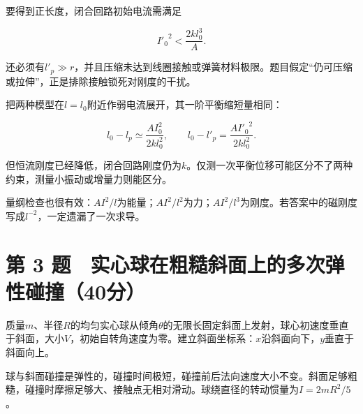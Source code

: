 \documentclass[12pt,a4paper,fontset=fandol]{ctexart}
\begin{document}
要得到正长度，闭合回路初始电流需满足

\[
{I'_0}^2<\frac{2kl_0^3}{A}.
\]

还必须有\(l'_p\gg r\)，并且压缩未达到线圈接触或弹簧材料极限。题目假定``仍可压缩或拉伸''，正是排除接触锁死对刚度的干扰。

把两种模型在\(l=l_0\)附近作弱电流展开，其一阶平衡缩短量相同：

\[
l_0-l_p\simeq\frac{AI_0^2}{2kl_0^2},
\qquad
l_0-l'_p=\frac{A{I'_0}^2}{2kl_0^2}.
\]

但恒流刚度已经降低，闭合回路刚度仍为\(k\)。仅测一次平衡位移可能区分不了两种约束，测量小振动或增量力则能区分。

量纲检查也很有效：\(AI^2/l\)为能量；\(AI^2/l^2\)为力；\(AI^2/l^3\)为刚度。若答案中的磁刚度写成\(l^{-2}\)，一定遗漏了一次求导。

\clearpage

\section{第 3
题　实心球在粗糙斜面上的多次弹性碰撞（40分）}\label{ux7b2c-3-ux9898-ux5b9eux5fc3ux7403ux5728ux7c97ux7cd9ux659cux9762ux4e0aux7684ux591aux6b21ux5f39ux6027ux78b0ux649e40ux5206}

质量\(m\)、半径\(R\)的均匀实心球从倾角\(\theta\)的无限长固定斜面上发射，球心初速度垂直于斜面，大小\(V\)，初始自转角速度为零。建立斜面坐标系：\(x\)沿斜面向下，\(y\)垂直于斜面向上。

球与斜面碰撞是弹性的，碰撞时间极短，碰撞前后法向速度大小不变。斜面足够粗糙，碰撞时摩擦足够大、接触点无相对滑动。球绕直径的转动惯量为\(I=2mR^2/5\)。

\begin{center}
\begin{minipage}{\linewidth}
\centering\begingroup{}
\ifdim\wd\diagrambox>.88\linewidth
\sbox{\diagrambox}{\resizebox{.88\linewidth}{!}{\usebox{\diagrambox}}}\fi
\ifdim\ht\diagrambox>.38\textheight
\resizebox{!}{.38\textheight}{\usebox{\diagrambox}}
\else\usebox{\diagrambox}\fi
\par{}\endgroup\end{minipage}\end{center}
\end{document}
